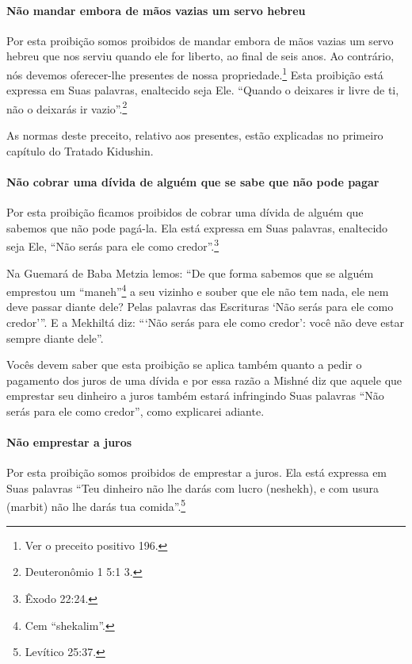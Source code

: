 \paragraph{Não mandar embora de mãos vazias um servo hebreu}

Por esta proibição somos proibidos de mandar embora de mãos vazias um
servo hebreu que nos serviu quando ele for liberto, ao final de seis
anos. Ao contrário, nós devemos oferecer-lhe presentes de nossa
propriedade.\footnote{Ver o preceito positivo 196.} Esta proibição está expressa em Suas
palavras, enaltecido seja Ele. ``Quando o deixares ir livre de ti, não
o deixarás ir vazio''.\footnote{Deuteronômio 1 5:1 3.}

As normas deste preceito, relativo aos presentes, estão explicadas no
primeiro capítulo do Tratado Kidushin.

\paragraph{Não cobrar uma dívida de alguém que se sabe que não pode pagar}

Por esta proibição ficamos proibidos de cobrar uma dívida de alguém que
sabemos que não pode pagá-la. Ela está expressa em Suas palavras,
enaltecido seja Ele, ``Não serás para ele como credor''.\footnote{Êxodo 22:24.}

Na Guemará de Baba Metzia lemos: ``De que forma sabemos que se alguém
emprestou um ``maneh''\footnote{Cem ``shekalim''.} a seu vizinho e souber que
ele não tem nada, ele nem deve passar diante dele? Pelas palavras das
Escrituras `Não serás para ele como credor'''. E a Mekhiltá diz: ```Não
serás para ele como credor': você não deve estar sempre diante dele''.

Vocês devem saber que esta proibição se aplica também quanto a pedir o
pagamento dos juros de uma dívida e por essa razão a Mishné diz que
aquele que emprestar seu dinheiro a juros também estará infringindo Suas
palavras ``Não serás para ele como credor'', como explicarei adiante.

\paragraph{Não emprestar a juros}

Por esta proibição somos proibidos de emprestar a juros. Ela está
expressa em Suas palavras ``Teu dinheiro não lhe darás com lucro
(neshekh), e com usura (marbit) não lhe darás tua comida''.\footnote{Levítico
25:37.}

